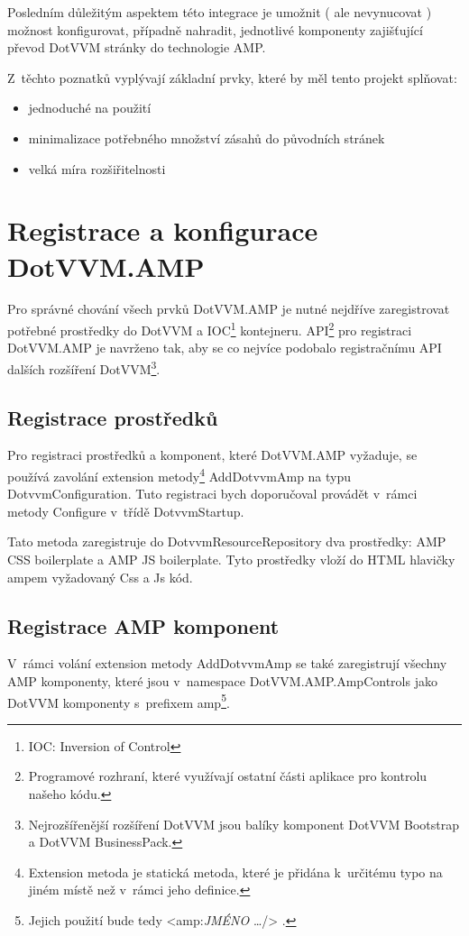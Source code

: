 Posledním důležitým aspektem této integrace je umožnit ( ale nevynucovat ) možnost konfigurovat, případně nahradit, jednotlivé komponenty zajišťující převod DotVVM stránky do technologie AMP.

Z~těchto poznatků vyplývají základní prvky, které by měl tento projekt splňovat:

\begin{itemize}
\item jednoduché na použití
\item minimalizace potřebného množství zásahů do původních stránek
\item velká míra rozšiřitelnosti
\end{itemize}
\section{Registrace a konfigurace DotVVM.AMP}
Pro správné chování všech prvků DotVVM.AMP je nutné nejdříve zaregistrovat potřebné prostředky do DotVVM a IOC\footnote{IOC: Inversion of Control} kontejneru. API\footnote{Programové rozhraní, které využívají ostatní části aplikace pro kontrolu našeho kódu.} pro registraci DotVVM.AMP je navrženo tak, aby se co nejvíce podobalo registračnímu API dalších rozšíření DotVVM\footnote{Nejrozšířenější rozšíření DotVVM jsou balíky komponent DotVVM Bootstrap a DotVVM BusinessPack.}.

\subsection*{Registrace prostředků}
Pro registraci prostředků a komponent, které DotVVM.AMP vyžaduje, se používá zavolání extension metody\footnote{\label{extension}Extension metoda je statická metoda, které je přidána k~určitému typo na jiném místě než v~rámci jeho definice.} AddDotvvmAmp na typu DotvvmConfiguration. Tuto registraci bych doporučoval provádět v~rámci metody Configure v~třídě DotvvmStartup.

Tato metoda zaregistruje do DotvvmResourceRepository dva prostředky: AMP CSS boilerplate a AMP JS boilerplate. Tyto prostředky vloží do HTML hlavičky ampem vyžadovaný Css a Js kód.

\subsection*{Registrace AMP komponent}
V~rámci volání extension metody AddDotvvmAmp se také zaregistrují všechny AMP komponenty, které jsou v~namespace DotVVM.AMP.AmpControls jako DotVVM komponenty s~prefixem amp\footnote{Jejich použití bude tedy <amp:\textit{JMÉNO} \ldots /> . }.

